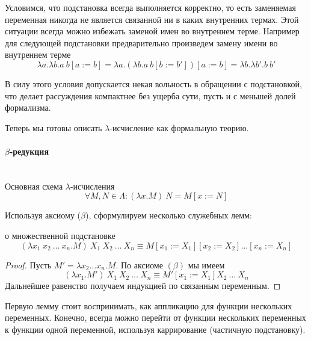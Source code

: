 \documentclass[lambda.tex]{subfiles}
\begin{document}

Условимся, что подстановка всегда выполняется корректно, то есть заменяемая переменная никогда не является связанной ни в каких внутренних термах. Этой ситуации всегда можно избежать заменой имен во внутреннем терме. Например для следующей подстановки предварительно произведем замену имени во внутреннем терме
\[\lambda a.\lambda b.a\ b[a := b] = \lambda a.(\lambda b.a\ b[b := b'])[a := b] = \lambda b.\lambda b'.b\ b'\]

В силу этого условия допускается некая вольность в обращении с подстановкой, что делает рассуждения компактнее без ущерба сути, пусть и с меньшей долей формализма.


Теперь мы готовы описать $\lambda$-исчисление как формальную теорию.

\newpage
\paragraph{$\beta$-редукция} %
\label{par:beta reduction}~\\

Основная схема $\lambda$-исчисления
\begin{equation*}
	\forall M, N \in \Lambda : (\lambda x.M)\ N = M[x := N]\tag{$\beta$}
\end{equation*}

Используя аксиому ($\beta$), сформулируем несколько служебных лемм:
\begin{lemma}{о множественной подстановке}
	\[(\lambda x_1 \ x_2 \ \dots\ x_n .M)\ X_1 \ X_2 \ \dots\ X_n \equiv M[x_1 := X_1 ][x_2 := X_2]\dots[x_n := X_n ]\]
\end{lemma}
\begin{proof}
	Пусть $M' = \lambda x_2 \dots x_n .M$. По аксиоме $(\beta)$ мы имеем
	\[(\lambda x_1 .M')\ X_1 \ X_2 \ \dots\ X_n \equiv M'[x_1 := X_1 ] X_2 \ \dots\ X_n\]
	Дальнейшее равенство получаем индукцией по связанным переменным.
\end{proof}

Первую лемму стоит воспринимать, как аппликацию для функции нескольких переменных. Конечно, всегда можно перейти от функции нескольких переменных к функции одной переменной, используя каррирование (частичную подстановку).
\end{document}

